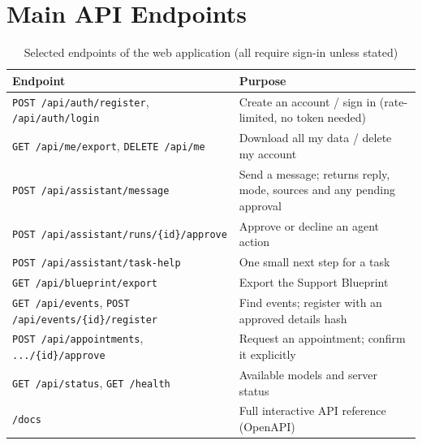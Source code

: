 \documentclass[11pt,a4paper]{article}
\newcommand{\code}[1]{\texttt{#1}}
\begin{document}
\section{Main API Endpoints}\label{app:api}
\begin{table}[H]
\centering
\caption{Selected endpoints of the web application (all require sign-in unless stated)}
\label{tab:api}
\small
\begin{tabularx}{\textwidth}{@{}lY@{}}
\toprule
\textbf{Endpoint} & \textbf{Purpose}\\
\midrule
\code{POST /api/auth/register}, \code{/api/auth/login} & Create an account / sign in (rate-limited, no token needed)\\
\code{GET /api/me/export}, \code{DELETE /api/me} & Download all my data / delete my account\\
\code{POST /api/assistant/message} & Send a message; returns reply, mode, sources and any pending approval\\
\code{POST /api/assistant/runs/\{id\}/approve} & Approve or decline an agent action\\
\code{POST /api/assistant/task-help} & One small next step for a task\\
\code{GET /api/blueprint/export} & Export the Support Blueprint\\
\code{GET /api/events}, \code{POST /api/events/\{id\}/register} & Find events; register with an approved details hash\\
\code{POST /api/appointments}, \code{.../\{id\}/approve} & Request an appointment; confirm it explicitly\\
\code{GET /api/status}, \code{GET /health} & Available models and server status\\
\code{/docs} & Full interactive API reference (OpenAPI)\\
\bottomrule
\end{tabularx}
\end{table}
\end{document}
